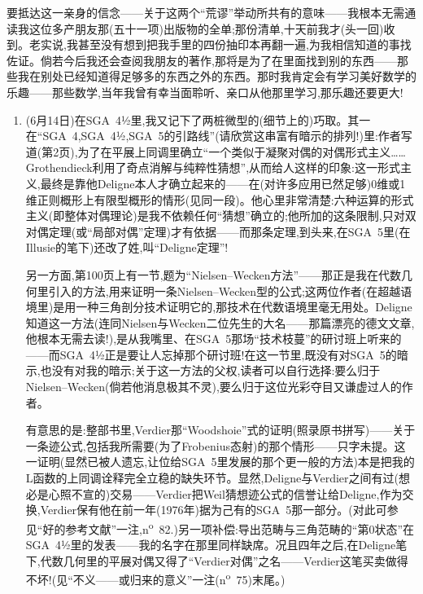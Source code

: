 要抵达这一亲身的信念——关于这两个“荒谬”举动所共有的意味——我根本无需通读我这位多产朋友那(五十一项)出版物的全单;那份清单,十天前我才(头一回)收到。老实说,我甚至没有想到把我手里的四份抽印本再翻一遍,为我相信知道的事找佐证。倘若今后我还会查阅我朋友的著作,那将是为了在里面找到别的东西——那些我在别处已经知道得足够多的东西之外的东西。那时我肯定会有学习美好数学的乐趣——那些数学,当年我曾有幸当面聆听、亲口从他那里学习,那乐趣还要更大!


\begingroup
\renewcommand{\labelenumi}{(\arabic{enumi})}
\begin{enumerate}
\item (6月14日)在SGA~4½里,我又记下了两桩微型的(细节上的)巧取。其一在“SGA~4,SGA~4½,SGA~5的引路线”(请欣赏这串富有暗示的排列!)里:作者写道(第2页),为了在平展上同调里确立“一个类似于凝聚对偶的对偶形式主义……Grothendieck利用了奇点消解与纯粹性猜想”,从而给人这样的印象:这一形式主义,最终是靠他Deligne本人才确立起来的——在(对许多应用已然足够)0维或1维正则概形上有限型概形的情形(见同一段)。他心里非常清楚:六种运算的形式主义(即整体对偶理论)是我不依赖任何“猜想”确立的;他所加的这条限制,只对双对偶定理(或“局部对偶”定理)才有依据——而那条定理,到头来,在SGA~5里(在Illusie的笔下)还改了姓,叫“Deligne定理”!

另一方面,第100页上有一节,题为“Nielsen--Wecken方法”——那正是我在代数几何里引入的方法,用来证明一条Nielsen--Wecken型的公式;这两位作者(在超越语境里)是用一种三角剖分技术证明它的,那技术在\dmark{}代数语境里毫无用处。Deligne知道这一方法(连同Nielsen与Wecken二位先生的大名——那篇漂亮的德文文章,他根本无需去读!),是从我嘴里、在SGA~5那场“技术枝蔓”的研讨班上听来的——而SGA~4½正是要让人忘掉那个研讨班!在这一节里,既没有对SGA~5的暗示,也没有对我的暗示;关于这一方法的父权,读者可以自行选择:要么归于Nielsen--Wecken(倘若他消息极其不灵),要么归于这位光彩夺目又谦虚过人的作者。

有意思的是:整部书里,Verdier那“Woodshoie”式的证明(照录原书拼写)——关于一条迹公式,包括我所需要(为了Frobenius态射)的那个情形——只字未提。这一证明(显然已被人遗忘,让位给SGA~5里发展的那个更一般的方法)本是把我的L函数的上同调诠释完全立稳的缺失环节。显然,Deligne与Verdier之间有过(想必是心照不宣的)交易——Verdier把Weil猜想迹公式的信誉让给Deligne,作为交换,Verdier保有他在前一年(1976年)据为己有的SGA~5那一部分。(对此可参见“好的参考文献”一注,n\textsuperscript{o}~82.)另一项补偿:导出范畴与三角范畴的“第0状态”在SGA~4½里的发表——我的名字在那里同样缺席。况且四年之后,在Deligne笔下,代数几何里的平展对偶又得了“Verdier对偶”之名——Verdier这笔买卖做得不坏!(见“不义——或归来的意义”一注(n\textsuperscript{o}~75)末尾。)

\end{enumerate}
\endgroup


